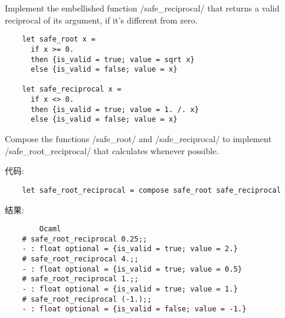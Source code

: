 \documentclass[lang=cn]{elegantbook}
\begin{document}
\begin{exercise}
Implement the embellished function \cppinline/safe_reciprocal/ that returns a valid reciprocal of its argument, if it’s different from zero.
\end{exercise}

\begin{solution}

\begin{verbatim}
    let safe_root x =
      if x >= 0.
      then {is_valid = true; value = sqrt x}
      else {is_valid = false; value = x}

    let safe_reciprocal x =
      if x <> 0.
      then {is_valid = true; value = 1. /. x}
      else {is_valid = false; value = x}
\end{verbatim}

\end{solution}

\begin{exercise}
Compose the functions \cppinline/safe_root/ and \cppinline/safe_reciprocal/ to implement \cppinline/safe_root_reciprocal/ that calculates  whenever possible.
\end{exercise}

\begin{solution}
代码:
\begin{verbatim}
    let safe_root_reciprocal = compose safe_root safe_reciprocal
\end{verbatim}
结果:
\begin{verbatim}
        Ocaml
    # safe_root_reciprocal 0.25;;
    - : float optional = {is_valid = true; value = 2.}
    # safe_root_reciprocal 4.;;
    - : float optional = {is_valid = true; value = 0.5}
    # safe_root_reciprocal 1.;;
    - : float optional = {is_valid = true; value = 1.}
    # safe_root_reciprocal (-1.);;
    - : float optional = {is_valid = false; value = -1.}
\end{verbatim}

\end{solution}
\end{document}
